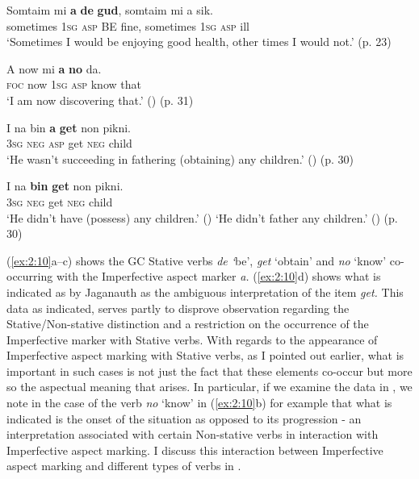 \ea
\gll Somtaim       mi \textbf{a}      \textbf{de}   \textbf{gud},   somtaim      mi   a       sik.\\
          sometimes \textsc{1sg}  \textsc{asp} BE fine, sometimes \textsc{1sg}   \textsc{asp} ill\\
\glt `Sometimes I would be enjoying good health, other times I would not.' (p. 23)

\ex
\gll 		A       now     mi \textbf{a}      \textbf{no} da.\\
\textsc{foc} now     \textsc{1sg}   \textsc{asp} know    that\\
\glt `I am now discovering that.' (\DYNAMIC) (p. 31)

\ex
\gll I     na     bin \textbf{a}   \textbf{get} non    pikni.\\
		\textsc{3sg} \textsc{neg} {\TNS} \textsc{asp} get     \textsc{neg}   child\\
\glt `He wasn’t succeeding in fathering (obtaining) any children.'
(\DYNAMIC) (p. 30)

\ex
\gll I na \textbf{bin}     \textbf{get} non   pikni.\\
\textsc{3sg} \textsc{neg} {\TNS}   get  \textsc{neg} child\\
\glt `He didn’t have (possess) any children.' (\STATIVE) \glt `He didn’t
father any children.' (\DYNAMIC) (p. 30) \z \z

(\ref{ex:2:10}a--c) shows the GC Stative verbs
\textit{de ‘}be’, \textit{get} `obtain' and \textit{no} `know'
co-oc\-cur\-ring with the Imperfective aspect marker \textit{a.}
(\ref{ex:2:10}d) shows what is indicated as by Jaganauth as the
ambiguous interpretation of the item \textit{get.}  This data as
indicated, serves partly to disprove 
observation regarding the Stative\slash Non-stative distinction and a
restriction on the occurrence of the Imperfective marker with Stative
verbs.  With regards to the appearance of Imperfective aspect marking
with Stative verbs, as I pointed out earlier, what is important in such
cases is not just the fact that these elements co-occur but more so
the aspectual meaning that arises.  In particular, if we examine the
data in , we note in the case of the verb \textit{no}
`know' in (\ref{ex:2:10}b) for example that what is indicated is the
onset of the situation as opposed to its progression - an
interpretation associated with certain Non-stative verbs in
interaction with Imperfective aspect marking.  I discuss this
interaction between Imperfective aspect marking and different types of
verbs in .

